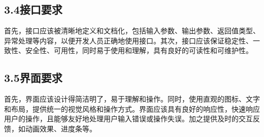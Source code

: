 \documentclass[24pt,a4paper]{article}%
\begin{document}
\subsection*{\songti 3.4接口要求}
首先，接口应该被清晰地定义和文档化，包括输入参数、输出参数、返回值类型、异常处理等内容，以便开发人员正确地使用接口。其次，接口应该保证稳定性、一致性、安全性、可用性，同时易于使用和理解，具有良好的可读性和可维护性。
\subsection*{\songti 3.5界面要求}
首先，界面应该设计得简洁明了，易于理解和操作。同时，使用直观的图标、文字和布局，提供统一的视觉风格和操作方式。界面应该具有良好的响应性，快速响应用户的操作，且能够友好地处理用户输入错误或操作失误。加之提供及时的交互反馈，如动画效果、进度条等。
\newpage
\end{document}
